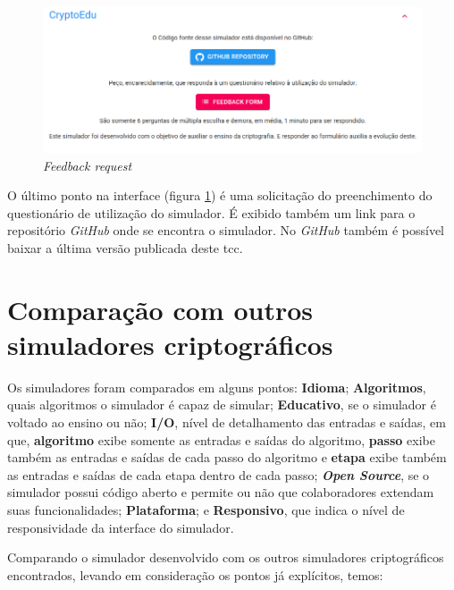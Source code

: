 \begin{figure}[H]
    \centering
    \caption{\textit{Feedback request}}
    \label{fig:uifeedback}
    \includegraphics[width=1\linewidth]{UI/UIFeedback.png}
\end{figure}

O último ponto na interface (figura \ref{fig:uifeedback}) é uma solicitação do preenchimento do questionário de utilização do simulador. É exibido também um link para o repositório \textit{GitHub} onde se encontra o simulador. No \textit{GitHub} também é possível baixar a última versão publicada deste \acrshort{tcc}.

\section{Comparação com outros simuladores criptográficos}
Os simuladores foram comparados em alguns pontos: \textbf{Idioma}; \textbf{Algoritmos}, quais algoritmos o simulador é capaz de simular; \textbf{Educativo}, se o simulador é voltado ao ensino ou não; \textbf{I/O}, nível de detalhamento das entradas e saídas, em que, \textbf{algoritmo} exibe somente as entradas e saídas do algoritmo, \textbf{passo} exibe também as entradas e saídas de cada passo do algoritmo e \textbf{etapa} exibe também as entradas e saídas de cada etapa dentro de cada passo; \textbf{\textit{Open Source}}, se o simulador possui código aberto e permite ou não que colaboradores extendam suas funcionalidades; \textbf{Plataforma}; e \textbf{Responsivo}, que indica o nível de responsividade da interface do simulador.

Comparando o simulador desenvolvido com os outros simuladores criptográficos encontrados, levando em consideração os pontos já explícitos, temos:

